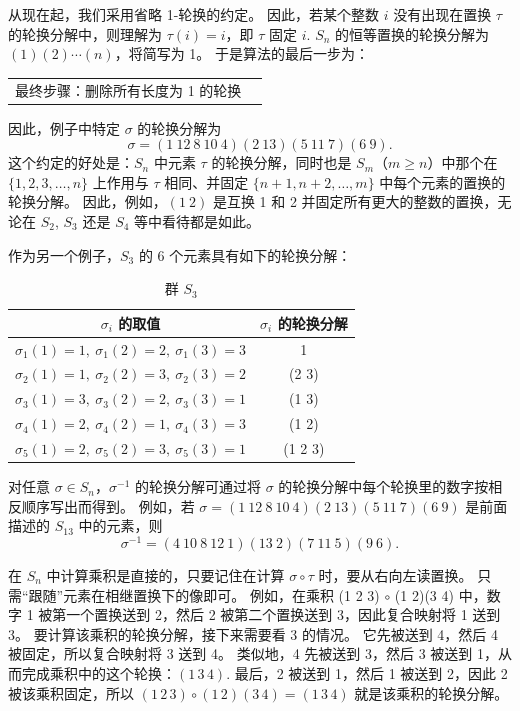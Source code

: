 从现在起，我们采用省略 1-轮换的约定。
因此，若某个整数 \(i\) 没有出现在置换 \(\tau\) 的轮换分解中，则理解为 \(\tau(i) = i\)，即 \(\tau\) 固定 \(i\). 
\(S_n\) 的恒等置换的轮换分解为 \((1)(2)\cdots(n)\)，将简写为 1。
于是算法的最后一步为：

\begin{tabular}{|p{9cm}|p{4cm}|}
\hline
最终步骤：删除所有长度为 1 的轮换
\hline
\end{tabular}
\vspace{\baselineskip}

因此，例子中特定 \(\sigma\) 的轮换分解为
\[
\sigma = (1\ 12\ 8\ 10\ 4)(2\ 13)(5\ 11\ 7)(6\ 9).
\]
这个约定的好处是：\(S_n\) 中元素 \(\tau\) 的轮换分解，同时也是 \(S_m\)（\(m \geq n\)）中那个在 \(\{1, 2, 3, \dots, n\}\) 上作用与 \(\tau\) 相同、并固定 \(\{n+1, n+2, \dots, m\}\) 中每个元素的置换的轮换分解。
因此，例如，\((1\ 2)\) 是互换 1 和 2 并固定所有更大的整数的置换，无论在 \(S_2\), \(S_3\) 还是 \(S_4\) 等中看待都是如此。

作为另一个例子，\(S_3\) 的 6 个元素具有如下的轮换分解：

\begin{table}[h!]
    \centering
    \caption{群 \( S_3 \)}
    \begin{tabular}{|c|c|}
\hline
\( \sigma_i \) 的取值 & \( \sigma_i \) 的轮换分解 \\
\hline
\(\sigma_1(1) = 1,\ \sigma_1(2) = 2,\ \sigma_1(3) = 3\) & 1 \\
\(\sigma_2(1) = 1,\ \sigma_2(2) = 3,\ \sigma_2(3) = 2\) & (2 3) \\
\(\sigma_3(1) = 3,\ \sigma_3(2) = 2,\ \sigma_3(3) = 1\) & (1 3) \\
\(\sigma_4(1) = 2,\ \sigma_4(2) = 1,\ \sigma_4(3) = 3\) & (1 2) \\
\(\sigma_5(1) = 2,\ \sigma_5(2) = 3,\ \sigma_5(3) = 1\) & (1 2 3) \\
\hline
\end{tabular}
    \label{tab:placeholder}
\end{table}

对任意 \( \sigma \in S_n \)，\( \sigma^{-1} \) 的轮换分解可通过将 \( \sigma \) 的轮换分解中每个轮换里的数字按相反顺序写出而得到。
例如，若
$\sigma = (1\ 12\ 8\ 10\ 4)(2\ 13)(5\ 11\ 7)(6\ 9) $
是前面描述的 \( S_{13} \) 中的元素，则
\[ \sigma^{-1} = (4\ 10\ 8\ 12\ 1)(13\ 2)(7\ 11\ 5)(9\ 6). \]

在 \( S_n \) 中计算乘积是直接的，只要记住在计算 \( \sigma \circ \tau \) 时，要从右向左读置换。
只需“跟随”元素在相继置换下的像即可。
例如，在乘积 (1 2 3) \(\circ\) (1 2)(3 4) 中，数字 1 被第一个置换送到 2，然后 2 被第二个置换送到 3，因此复合映射将 1 送到 3。
要计算该乘积的轮换分解，接下来需要看 3 的情况。
它先被送到 4，然后 4 被固定，所以复合映射将 3 送到 4。
类似地，4 先被送到 3，然后 3 被送到 1，从而完成乘积中的这个轮换：\((1 \, 3 \, 4)\). 
最后，2 被送到 1，然后 1 被送到 2，因此 2 被该乘积固定，所以 \((1 \, 2 \, 3) \circ (1 \, 2)(3 \, 4) = (1 \, 3 \, 4)\) 就是该乘积的轮换分解。

